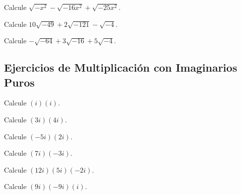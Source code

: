 \begin{ejercicio}
Calcule $\displaystyle \sqrt{-x^2}-\sqrt{-16x^2}+\sqrt{-25x^2}$.
\end{ejercicio}

\begin{ejercicio}
Calcule $\displaystyle 10\sqrt{-49}+2\sqrt{-121}-\sqrt{-4}$.
\end{ejercicio}

\begin{ejercicio}
Calcule $\displaystyle -\sqrt{-64}+3\sqrt{-16}+5\sqrt{-4}$.
\end{ejercicio}

\subsection*{Ejercicios de Multiplicación con Imaginarios Puros}

\begin{ejercicio}
Calcule $\displaystyle (i)(i)$.
\end{ejercicio}

\begin{ejercicio}
Calcule $\displaystyle (3i)(4i)$.
\end{ejercicio}

\begin{ejercicio}
Calcule $\displaystyle (-5i)(2i)$.
\end{ejercicio}

\begin{ejercicio}
Calcule $\displaystyle (7i)(-3i)$.
\end{ejercicio}

\begin{ejercicio}
Calcule $\displaystyle (12i)(5i)(-2i)$.
\end{ejercicio}

\begin{ejercicio}
Calcule $\displaystyle (9i)(-9i)(i)$.
\end{ejercicio}

